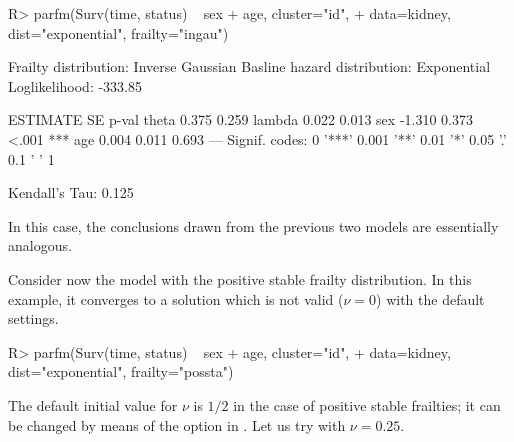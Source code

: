 \begin{CodeChunk}
\begin{CodeInput}
R> parfm(Surv(time, status) ~ sex + age, cluster="id", 
+        data=kidney, dist="exponential", frailty="ingau")
\end{CodeInput}
\begin{CodeOutput}
Frailty distribution: Inverse Gaussian 
Basline hazard distribution: Exponential 
Loglikelihood: -333.85 

       ESTIMATE SE    p-val    
theta   0.375   0.259          
lambda  0.022   0.013          
sex    -1.310   0.373 <.001 ***
age     0.004   0.011 0.693    
---
Signif. codes: 0 '***' 0.001 '**' 0.01 '*' 0.05 '.' 0.1 ' ' 1

Kendall's Tau: 0.125 
\end{CodeOutput}
\end{CodeChunk}

In this case, the conclusions drawn from the previous two models are essentially analogous.

Consider now the model with the positive stable frailty distribution.
In this example, it converges to a solution which is not valid ($\nu=0$)
  with the default settings.

\begin{CodeChunk}
\begin{CodeInput}
R> parfm(Surv(time, status) ~ sex + age, cluster="id", 
+        data=kidney, dist="exponential", frailty="possta")
\end{CodeInput}
\end{CodeChunk}

The default initial value for $\nu$ is $1/2$ in the case of positive stable frailties;
 it can be changed by means of the  option in .
Let us try with $\nu= 0.25$.

